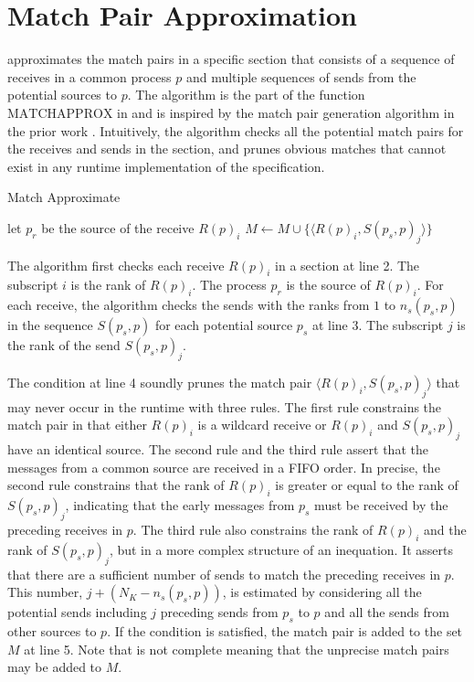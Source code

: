 \section{Match Pair Approximation}

 approximates the match pairs in a specific section that consists of a sequence of receives in a common process $p$ and multiple sequences of sends from the potential sources to $p$.
The algorithm is the part of the function $\mathrm{MATCHAPPROX}$ in  and is inspired by the match pair generation algorithm in the prior work \cite{DBLP:conf/kbse/HuangMM13}. 
Intuitively, the algorithm checks all the potential match pairs for the receives and sends in the section, and prunes obvious matches that cannot exist in any runtime implementation of the specification.

\begin{algorithm}
\caption{Match Approximate}\label{algo:match}
\begin{algorithmic}[1]
\State let $p_r$ be the source of the receive $R(p)_i$
\State $M\gets M\cup\{\langle R(p)_i,S(p_s,p)_j \rangle\}$
\EndIf
\EndFor
\EndFor
\end{algorithmic}
\end{algorithm}

The algorithm first checks each receive $R(p)_i$ in a section at line 2. The subscript $i$ is the rank of $R(p)_i$. The process $p_r$ is the source of $R(p)_i$.
For each receive, the algorithm checks the sends with the ranks from $1$ to $n_s(p_s,p)$ in the sequence $S(p_s,p)$ for each potential source $p_s$ at line 3.
The subscript $j$ is the rank of the send $S(p_s,p)_j$. 

The condition at line 4 soundly prunes the match pair $\langle R(p)_i,S(p_s,p)_j\rangle$ that may never occur in the runtime with three rules. The first rule constrains the match pair in that either $R(p)_i$ is a wildcard receive or $R(p)_i$ and $S(p_s,p)_j$ have an identical source. The second rule and the third rule assert that the messages from a common source are received in a FIFO order. In precise, the second rule constrains that the rank of $R(p)_i$ is greater or equal to the rank of $S(p_s,p)_j$, indicating that the early messages from $p_s$ must be received by the preceding receives in $p$. The third rule also constrains the rank of $R(p)_i$ and the rank of $S(p_s,p)_j$, but in a more complex structure of an inequation. It asserts that there are a sufficient number of sends to match the preceding receives in $p$. This number, $j + (N_K - \mathit{n_s}(p_s,p))$, is estimated by considering all the potential sends including $j$ preceding sends from $p_s$ to $p$ and all the sends from other sources to $p$.
If the condition is satisfied, the match pair is added to the set $M$ at line 5. Note that  is not complete meaning that the unprecise match pairs may be added to $M$.

